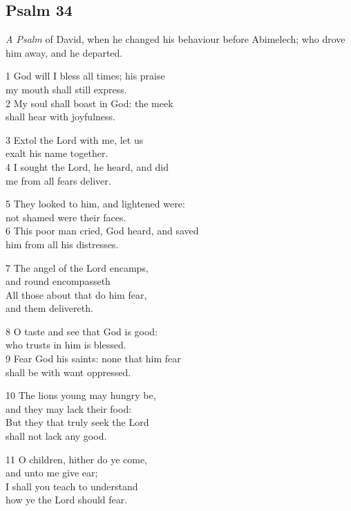\begin{center}
\quad{}\quad{}
\end{center}

\subsection*{Psalm 34 }

\emph{A Psalm} of David, when he changed his behaviour before Abimelech; who drove him away, and he departed.

1 God will I bless all times; his praise\\
my mouth shall still express.\\
2 My soul shall boast in God: the meek\\
shall hear with joyfulness.

3 Extol the Lord with me, let us\\
exalt his name together.\\
4 I sought the Lord, he heard, and did\\
me from all fears deliver.

5 They looked to him, and lightened were:\\
not shamed were their faces.\\
6 This poor man cried, God heard, and saved\\
him from all his distresses.

7 The angel of the Lord encamps,\\
and round encompasseth\\
All those about that do him fear,\\
and them delivereth.

8 O taste and see that God is good:\\
who trusts in him is blessed.\\
9 Fear God his saints: none that him fear\\
shall be with want oppressed.

10 The lions young may hungry be,\\
and they may lack their food:\\
But they that truly seek the Lord\\
shall not lack any good.

11 O children, hither do ye come,\\
and unto me give ear;\\
I shall you teach to understand\\
how ye the Lord should fear.


